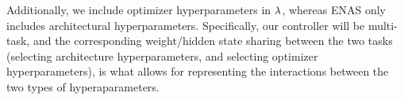 \documentclass{article}
\begin{document}
Additionally, we include optimizer hyperparameters in $\lambda$, whereas ENAS only includes architectural hyperparameters. Specifically, our controller will be multi-task, and the corresponding weight/hidden state sharing between the two tasks (selecting architecture hyperparameters, and selecting optimizer hyperparameters), is what allows for representing the interactions between the two types of hyperaparameters.

%
%
%
%
%
%
%


\end{document}
